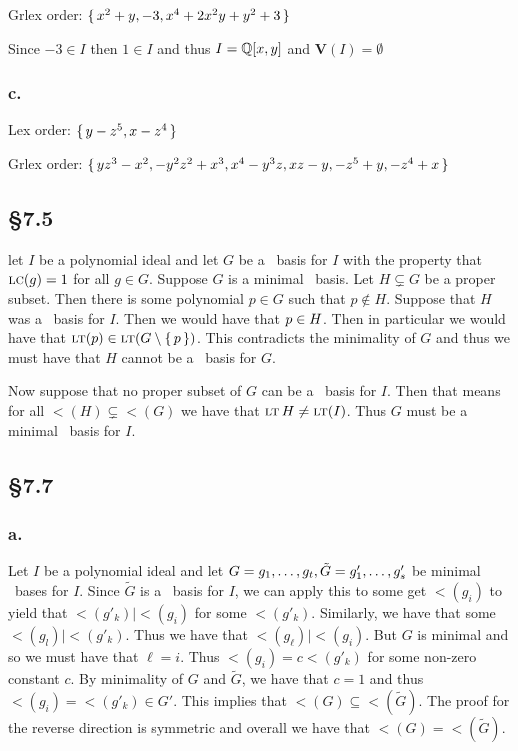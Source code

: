 \documentclass[letterpaper]{article}
\begin{document}
Grlex order: $\set{x^{2} + y, -3, x^{4} + 2 x^{2} y + y^{2} + 3}$

Since $-3 \in I$ then $1 \in I$ and thus $I = \Q\bqty{x, y}$ and $\textbf{V}(I) = \emptyset$

\subsubsection*{c.}

Lex order: $\set{y - z^{5}, x - z^{4}}$

Grlex order: $\set{y z^{3} - x^{2}, -y^{2} z^{2} + x^{3}, x^{4} - y^{3} z, x z - y, -z^{5} + y, -z^{4} + x}$

\subsection*{\S 7.5}

let $I$ be a polynomial ideal and let $G$ be a \Grobner\ basis for $I$ with the property that $\operatorname{\textsc{lc}}(g) = 1$ for all $g \in G$. Suppose $G$ is a minimal \Grobner\ basis. Let $H \subsetneq G$ be a proper subset. Then there is some polynomial $p \in G$ such that $p \notin H$. Suppose that $H$ was a \Grobner\ basis for $I$. Then we would have that $p \in \gen{H}$. Then in particular we would have that $\lt(p) \in \gen{\lt(G \setminus \set{p})}$. This contradicts the minimality of $G$ and thus we must have that $H$ cannot be a \Grobner\ basis for $G$.

Now suppose that no proper subset of $G$ can be a \Grobner\ basis for $I$. Then that means for all $\lt(H) \subsetneq \lt(G)$ we have that $\gen{\lt{H}} \neq \gen{\lt(I)}$. Thus $G$ must be a minimal \Grobner\ basis for $I$.

\subsection*{\S 7.7}

\subsubsection*{a.}

Let $I$ be a polynomial ideal and let $G = \gen{g_{1}, \ldots, g_{t}}, \tilde{G} = \gen{g'_{1}, \ldots, g'_{s}}$ be minimal \Grobner\ bases for $I$. Since $\tilde{G}$ is a \Grobner\ basis for $I$, we can apply this to some get $\lt(g_{i})$ to yield that $\lt(g'_{k}) \mid \lt(g_{i})$ for some $\lt(g'_{k})$. Similarly, we have that some $\lt(g_{l}) \mid \lt(g'_{k})$. Thus we have that $\lt(g_{\ell}) \mid \lt(g_{i})$. But $G$ is minimal and so we must have that $\ell = i$. Thus $\lt(g_{i}) = c \lt(g'_{k})$ for some non-zero constant $c$. By minimality of $G$ and $\tilde{G}$, we have that $c = 1$ and thus $\lt(g_{i}) = \lt(g'_{k}) \in G'$. This implies that $\lt(G) \subseteq \lt(\tilde{G})$. The proof for the reverse direction is symmetric and overall we have that $\lt(G) = \lt(\tilde{G})$.
\end{document}
